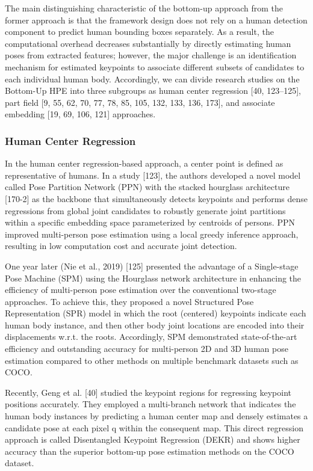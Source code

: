 The main distinguishing characteristic of the bottom-up approach from the former approach is that the framework design does not rely on a human detection component to predict human bounding boxes separately. As a result, the computational overhead decreases substantially by directly estimating human poses from extracted features; however, the major challenge is an identification mechanism for estimated keypoints to associate different subsets of candidates to each individual human body. Accordingly, we can divide research studies on the Bottom-Up HPE into three subgroups as human center regression [40, 123–125], part field [9, 55, 62, 70, 77, 78, 85, 105, 132, 133, 136, 173], and associate embedding [19, 69, 106, 121] approaches. 

\subsubsection{Human Center Regression}

In the human center regression-based approach, a center point is defined as representative of humans. In a study [123], the authors developed a novel model called Pose Partition Network (PPN) with the stacked hourglass architecture [170-2] as the backbone that simultaneously detects keypoints and performs dense regressions from global joint candidates to robustly generate joint partitions within a specific embedding space parameterized by centroids of persons. PPN improved multi-person pose estimation using a local greedy inference approach, resulting in low computation cost and accurate joint detection.

One year later (Nie et al., 2019) [125] presented the advantage of a Single-stage Pose Machine (SPM) using the Hourglass network architecture in enhancing the efficiency of multi-person pose estimation over the conventional two-stage approaches. To achieve this, they proposed a novel  Structured Pose Representation (SPR) model in which the root (centered) keypoints indicate each human body instance, and then other body joint locations are encoded into their displacements w.r.t. the roots. Accordingly, SPM demonstrated state-of-the-art efficiency and outstanding accuracy for multi-person 2D and 3D human pose estimation compared to other methods on multiple benchmark datasets such as COCO.

Recently, Geng et al. [40] studied the keypoint regions for regressing keypoint positions accurately. They employed a multi-branch network that indicates the human body instances by predicting a human center map and densely estimates a candidate pose at each pixel q within the consequent map. This direct regression approach is called Disentangled Keypoint Regression (DEKR) and shows higher accuracy than the superior bottom-up pose estimation methods on the COCO dataset.

